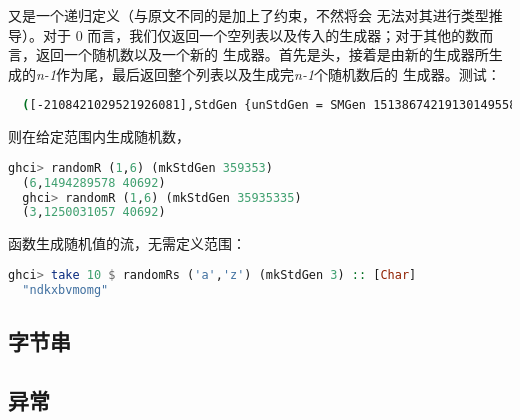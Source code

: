 \documentclass[./main.tex]{subfiles}
\begin{document}
又是一个递归定义（与原文不同的是加上了约束，不然将会
无法对其进行类型推导）。对于 0 而言，我们仅返回一个空列表以及传入的生成器；对于其他的数而言，返回一个随机数以及一个新的
生成器。首先是头，接着是由新的生成器所生成的\textit{n-1}作为尾，最后返回整个列表以及生成完\textit{n-1}个随机数后的
生成器。测试：

\begin{lstlisting}[language=Bash]
  % runhaskell ownRandom.hs 1 2
  ([-2108421029521926081],StdGen {unStdGen = SMGen 15138674219130149558 10905525725756348111})
\end{lstlisting}

则在给定范围内生成随机数，

\begin{lstlisting}[language=Haskell]
  ghci> randomR (1,6) (mkStdGen 359353)
  (6,1494289578 40692)
  ghci> randomR (1,6) (mkStdGen 35935335)
  (3,1250031057 40692)
\end{lstlisting}

函数生成随机值的流，无需定义范围：

\begin{lstlisting}[language=Haskell]
  ghci> take 10 $ randomRs ('a','z') (mkStdGen 3) :: [Char]
  "ndkxbvmomg"
\end{lstlisting}



\subsection*{字节串}


\subsection*{异常}

\end{document}
